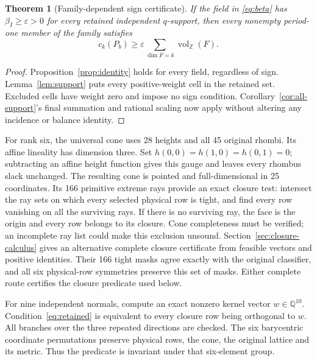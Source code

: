 \documentclass[11pt]{article}
\newtheorem{theorem}{Theorem}[section]
\theoremstyle{definition}\newtheorem{definition}[theorem]{Definition}
\theoremstyle{remark}\newtheorem{remark}[theorem]{Remark}
\newcommand{\Z}{\mathbb Z}\newcommand{\Q}{\mathbb Q}\newcommand{\R}{\mathbb R}
\newcommand{\vol}{\operatorname{vol}_{\Z}}
\newcommand{\eps}{\varepsilon}
\begin{document}
\begin{theorem}[Family-dependent sign certificate]\label{thm:pruned}
If the field in \eqref{eq:beta} has \(\beta_I\geq\eps>0\) for every
retained independent \(q\)-support, then every nonempty period-one member
of the family satisfies
\[
 c_k(P_b)\geq\eps\sum_{\dim F=k}\vol(F).
\]
\end{theorem}
\begin{proof}
Proposition~\ref{prop:identity} holds for every field, regardless of sign.
Lemma~\ref{lem:support} puts every positive-weight cell in the retained
set. Excluded cells have weight zero and impose no sign condition.
Corollary~\ref{cor:all-support}'s final summation and rational scaling now
apply without altering any incidence or balance identity.
\end{proof}

For rank six, the universal cone uses 28 heights and all 45 original rhombi.
Its affine lineality has dimension three. Set
\(h(0,0)=h(1,0)=h(0,1)=0\); subtracting an affine height function gives
this gauge and leaves every rhombus slack unchanged. The resulting cone is
pointed and full-dimensional in 25 coordinates. Its 166 primitive extreme
rays provide an exact closure test: intersect the ray sets on which every
selected physical row is tight, and find every row vanishing on all the
surviving rays. If there is no surviving ray, the face is the origin and
every row belongs to its closure. Cone completeness must be verified; an
incomplete ray list could make this exclusion unsound.
Section~\ref{sec:closure-calculus} gives an alternative complete closure
certificate from feasible vectors and positive identities. Their 166 tight
masks agree exactly with the original classifier, and all six physical-row
symmetries preserve this set of masks. Either complete route certifies the
closure predicate used below.

For nine independent normals, compute an exact nonzero kernel vector
\(w\in\Q^{10}\). Condition~\eqref{eq:retained} is equivalent to every
closure row being orthogonal to \(w\). All branches over the three repeated
directions are checked. The six barycentric coordinate permutations preserve
physical rows, the cone, the original lattice and its metric. Thus the
predicate is invariant under that six-element group.


\end{document}

